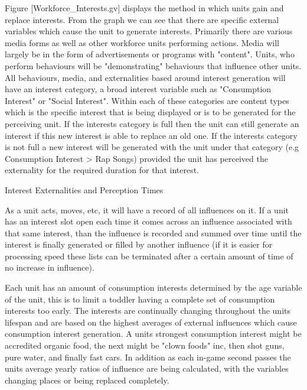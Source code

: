 Figure [Workforce_Interests.gv] displays the method in which units gain and replace interests. From the graph we can see that there are specific external variables which cause the unit to generate interests. Primarily there are various media forms as well as other workforce units performing actions. Media will largely be in the form of advertisements or programs with "content". Units, who perform behaviours will be "demonstrating" behaviours that influence other units. All behaviours, media, and externalities based around interest generation will have an interest category, a broad interest variable such as "Consumption Interest" or "Social Interest". Within each of these categories are content types which is the specific interest that is being displayed or is to be generated for the perceiving unit. If the interests category is full then the unit can still generate an interest if this new interest is able to replace an old one. If the interests category is not full a new interest will be generated with the unit under that category (e.g Consumption Interest > Rap Songs) provided the unit has perceived the externality for the required duration for that interest.

Interest Externalities and Perception Times



As a unit acts, moves, etc, it will have a record of all influences on it. If a unit has an interest slot open each time it comes across an influence associated with that same interest, than the influence is recorded and summed over time until the interest is finally generated or filled by another influence (if it is easier for processing speed these lists can be terminated after a certain amount of time of no increase in influence).

Each unit has an amount of consumption interests determined by the age variable of the unit, this is to limit a toddler having a complete set of consumption interests too early. The interests are continually changing throughout the units lifespan and are based on the highest averages of external influences which cause consumption interest generation. A units strongest consumption interest might be accredited organic food, the next might be "clown foods" inc, then shot guns, pure water, and finally fast cars. In addition as each in-game second passes the units average yearly ratios of influence are being calculated, with the variables changing places or being replaced completely.   
 

